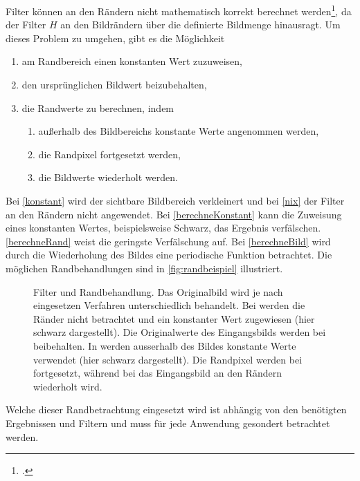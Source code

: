 Filter können an den Rändern nicht mathematisch korrekt berechnet werden\footcite[Vgl.][S.~113]{burger05}, da der
 Filter $H$ an den Bildrändern über die definierte Bildmenge hinausragt. Um dieses Problem zu umgehen, gibt es die
 Möglichkeit
\begin{enumerate}
	\item am Randbereich einen konstanten Wert zuzuweisen,\label{konstant}
	\item den ursprünglichen Bildwert beizubehalten,\label{nix}
	\item die Randwerte zu berechnen, indem
	\begin{enumerate}
		\item außerhalb des Bildbereichs konstante Werte angenommen werden,\label{berechneKonstant}
		\item die Randpixel fortgesetzt werden,\label{berechneRand}
		\item die Bildwerte wiederholt werden.\label{berechneBild}
	\end{enumerate}
\end{enumerate}

Bei \autoref{konstant} wird der sichtbare Bildbereich verkleinert und bei \autoref{nix} der Filter an den Rändern nicht
 angewendet. Bei \autoref{berechneKonstant} kann die Zuweisung eines konstanten Wertes, beispielsweise Schwarz, das
 Ergebnis verfälschen. \autoref{berechneRand} weist die geringste Verfälschung auf. Bei \autoref{berechneBild} wird
 durch die Wiederholung des Bildes eine periodische Funktion betrachtet. Die möglichen Randbehandlungen sind in
 \autoref{fig:randbeispiel} illustriert.
\begin{figure}[!ht]
	\centering
	\caption{Filter und Randbehandlung. Das Originalbild  wird je nach eingesetzen
	 Verfahren unterschiedlich behandelt. Bei  werden die Ränder nicht betrachtet und ein
	 konstanter Wert zugewiesen (hier schwarz dargestellt).	Die Originalwerte des Eingangsbilds werden bei
	  beibehalten. In  werden ausserhalb des Bildes konstante
	 Werte verwendet (hier schwarz dargestellt). Die Randpixel werden bei  fortgesetzt,
	 während bei  das Eingangsbild an den Rändern wiederholt wird.}
	\label{fig:randbeispiel}
\end{figure}
Welche dieser Randbetrachtung eingesetzt wird ist abhängig von den benötigten Ergebnissen und Filtern und muss für jede
 Anwendung gesondert betrachtet werden.

